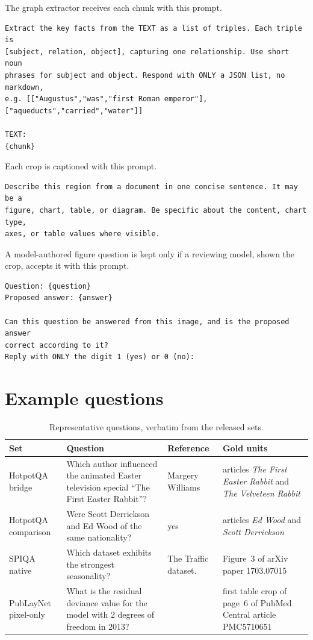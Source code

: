 \documentclass[preprint,12pt]{elsarticle}
\begin{document}
The graph extractor receives each chunk with this prompt.
{\scriptsize
\begin{verbatim}
Extract the key facts from the TEXT as a list of triples. Each triple is
[subject, relation, object], capturing one relationship. Use short noun
phrases for subject and object. Respond with ONLY a JSON list, no markdown,
e.g. [["Augustus","was","first Roman emperor"], ["aqueducts","carried","water"]]

TEXT:
{chunk}
\end{verbatim}}
\noindent Each crop is captioned with this prompt.
{\scriptsize
\begin{verbatim}
Describe this region from a document in one concise sentence. It may be a
figure, chart, table, or diagram. Be specific about the content, chart type,
axes, or table values where visible.
\end{verbatim}}
\noindent A model-authored figure question is kept only if a reviewing model,
shown the crop, accepts it with this prompt.
{\scriptsize
\begin{verbatim}
Question: {question}
Proposed answer: {answer}

Can this question be answered from this image, and is the proposed answer
correct according to it?
Reply with ONLY the digit 1 (yes) or 0 (no):
\end{verbatim}}

\section{Example questions}
\label{app:questions}

\begin{table}[h]
\centering
\caption{Representative questions, verbatim from the released sets.}
\label{tab:examples}
\renewcommand{\arraystretch}{1.25}
\footnotesize
\begin{tabular}{@{}>{\raggedright\arraybackslash}p{}>{\raggedright\arraybackslash}p{}>{\raggedright\arraybackslash}p{}>{\raggedright\arraybackslash}p{}@{}}
\toprule
Set & Question & Reference & Gold units \\
\midrule
HotpotQA bridge
& Which author influenced the animated Easter television special ``The First
  Easter Rabbit''?
& Margery Williams
& articles \emph{The First Easter Rabbit} and \emph{The Velveteen Rabbit} \\[2pt]
HotpotQA comparison
& Were Scott Derrickson and Ed Wood of the same nationality?
& yes
& articles \emph{Ed Wood} and \emph{Scott Derrickson} \\[2pt]
SPIQA native
& Which dataset exhibits the strongest seasonality?
& The Traffic dataset.
& Figure~3 of arXiv paper 1703.07015 \\[2pt]
PubLayNet pixel-only
& What is the residual deviance value for the model with 2 degrees of freedom
  in 2013?
& 44.45
& first table crop of page~6 of PubMed Central article PMC5710651 \\
\bottomrule
\end{tabular}
\end{table}
\end{document}
